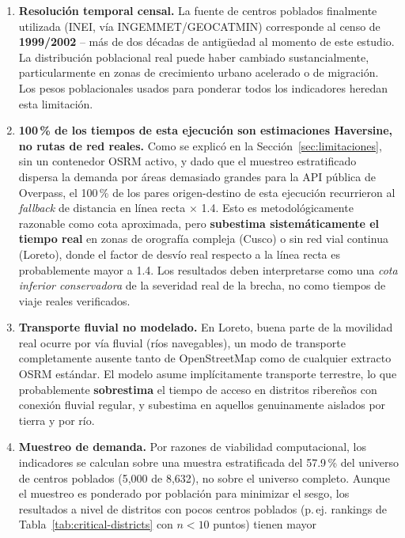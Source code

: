 \documentclass[11pt]{article}
\begin{document}
\begin{enumerate}
  \item \textbf{Resolución temporal censal.} La fuente de centros poblados
    finalmente utilizada (INEI, vía INGEMMET/GEOCATMIN) corresponde al
    censo de \textbf{1999/2002} -- más de dos décadas de antigüedad al
    momento de este estudio. La distribución poblacional real puede haber
    cambiado sustancialmente, particularmente en zonas de crecimiento
    urbano acelerado o de migración. Los pesos poblacionales usados para
    ponderar todos los indicadores heredan esta limitación.
  \item \textbf{100\,\% de los tiempos de esta ejecución son estimaciones
    Haversine, no rutas de red reales.} Como se explicó en la
    Sección~\ref{sec:limitaciones}, sin un contenedor OSRM activo, y dado
    que el muestreo estratificado dispersa la demanda por áreas
    demasiado grandes para la API pública de Overpass, el 100\,\% de los
    pares origen-destino de esta ejecución recurrieron al
    \textit{fallback} de distancia en línea recta $\times$ 1.4. Esto es
    metodológicamente razonable como cota aproximada, pero
    \textbf{subestima sistemáticamente el tiempo real} en zonas de
    orografía compleja (Cusco) o sin red vial continua (Loreto), donde el
    factor de desvío real respecto a la línea recta es probablemente mayor
    a 1.4. Los resultados deben interpretarse como una \emph{cota inferior
    conservadora} de la severidad real de la brecha, no como tiempos de
    viaje reales verificados.
  \item \textbf{Transporte fluvial no modelado.} En Loreto, buena parte de
    la movilidad real ocurre por vía fluvial (ríos navegables), un modo de
    transporte completamente ausente tanto de OpenStreetMap como de
    cualquier extracto OSRM estándar. El modelo asume implícitamente
    transporte terrestre, lo que probablemente \textbf{sobrestima} el
    tiempo de acceso en distritos ribereños con conexión fluvial regular,
    y subestima en aquellos genuinamente aislados por tierra y por río.
  \item \textbf{Muestreo de demanda.} Por razones de viabilidad
    computacional, los indicadores se calculan sobre una muestra
    estratificada del 57.9\,\% del universo de centros poblados (5{,}000
    de 8{,}632), no sobre el universo completo. Aunque el muestreo es
    ponderado por población para minimizar el sesgo, los resultados a
    nivel de distritos con pocos centros poblados (p.\,ej. rankings de
    Tabla~\ref{tab:critical-districts} con $n < 10$ puntos) tienen mayor

\end{enumerate}
\end{document}
